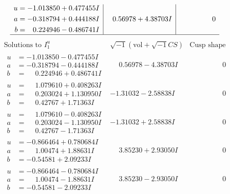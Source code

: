 \documentclass[1p]{elsarticle_modified}
\theoremstyle{definition}
\newcommand{\I}{\sqrt{-1}}
\begin{document}
$$\begin{array}{c|c|c}
\begin{aligned}
u &= -1.013850 + 0.477455 I \\
a &= -0.318794 + 0.444188 I \\
b &= \phantom{-}0.224946 - 0.486741 I\end{aligned}
 & \phantom{-}0.56978 + 4.38703 I & \phantom{-0.000000 } 0\\
 \hline 
 \end{array}$$\newpage$$\begin{array}{c|c|c}  
\text{Solutions to }I^u_{1}& \I (\text{vol} + \sqrt{-1}CS) & \text{Cusp shape}\\
 \hline 
\begin{aligned}
u &= -1.013850 - 0.477455 I \\
a &= -0.318794 - 0.444188 I \\
b &= \phantom{-}0.224946 + 0.486741 I\end{aligned}
 & \phantom{-}0.56978 - 4.38703 I & \phantom{-0.000000 } 0 \\ \hline\begin{aligned}
u &= \phantom{-}1.079610 + 0.408263 I \\
a &= \phantom{-}0.203024 + 1.130950 I \\
b &= \phantom{-}0.42767 + 1.71363 I\end{aligned}
 & -1.31032 - 2.58838 I & \phantom{-0.000000 } 0 \\ \hline\begin{aligned}
u &= \phantom{-}1.079610 - 0.408263 I \\
a &= \phantom{-}0.203024 - 1.130950 I \\
b &= \phantom{-}0.42767 - 1.71363 I\end{aligned}
 & -1.31032 + 2.58838 I & \phantom{-0.000000 } 0 \\ \hline\begin{aligned}
u &= -0.866464 + 0.780684 I \\
a &= \phantom{-}1.00474 + 1.88631 I \\
b &= -0.54581 + 2.09233 I\end{aligned}
 & \phantom{-}3.85230 + 2.93050 I & \phantom{-0.000000 } 0 \\ \hline\begin{aligned}
u &= -0.866464 - 0.780684 I \\
a &= \phantom{-}1.00474 - 1.88631 I \\
b &= -0.54581 - 2.09233 I\end{aligned}
 & \phantom{-}3.85230 - 2.93050 I & \phantom{-0.000000 } 0 \\ \hline\begin{aligned}

\end{aligned}
\end{array}$$
\end{document}
